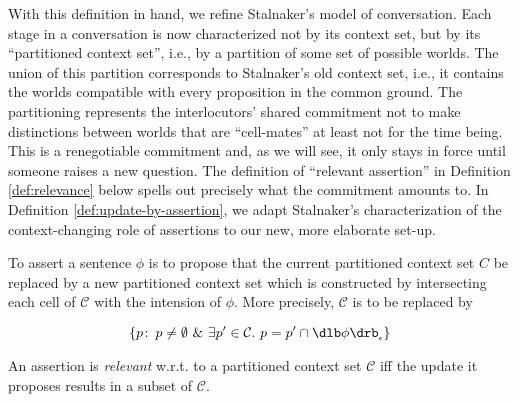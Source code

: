 \clearpage
{}%
%
%
With this definition in hand, we refine Stalnaker's model of conversation. Each
stage in a conversation is now characterized not by its context set, but by its
``partitioned context set'', i.e., by a partition of some set of possible
worlds. The union of this partition corresponds to Stalnaker's old context set,
i.e., it contains the worlds compatible with every proposition in the common
ground. The partitioning represents the interlocutors' shared commitment not to
make distinctions between worlds that are ``cell-mates'' \dash at least not for
the time being. This is a renegotiable commitment and, as we will see, it only
stays in force until someone raises a new question. The definition of ``relevant
assertion'' in Definition \ref{def:relevance} below spells out precisely what
the commitment amounts to. In Definition \ref{def:update-by-assertion}, we adapt
Stalnaker's characterization of the context-changing role of assertions to our
new, more elaborate set-up.

\begin{definition}\label{def:update-by-assertion}
  To assert a sentence $\phi$ is to propose that the current partitioned context
  set $C$ be replaced by a new partitioned context set which is constructed by
  intersecting each cell of $\mathcal{C}$ with the intension of $\phi$. More
  precisely, $\mathcal{C}$ is to be replaced by

  $$\{p\co p\neq\emptyset\ \&\ \exists p'\in \mathcal{C}.\ p = p' \cap \svcent{\phi}\}$$
\end{definition}

\begin{definition}[Relevance]\label{def:relevance}
  An assertion is \emph{relevant} w.r.t. to a partitioned context set
  $\mathcal{C}$ iff the update it proposes results in a subset of $\mathcal{C}$.
\end{definition}

